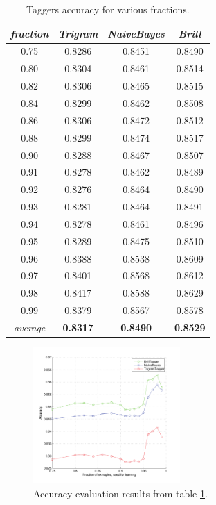 \documentclass[10pt, conference, compsocconf]{IEEEtran}
\begin{document}
\begin{table}[htb]
\begin{center}
\begin{tabular}{c|c|c|c}
\textit{fraction} & \textit{Trigram} & \textit{NaiveBayes} & \textit{Brill} \\\hline\hline
0.75  &  0.8286  &  0.8451  &  0.8490\\
0.80  &  0.8304  &  0.8461  &  0.8514\\
0.82  &  0.8306  &  0.8465  &  0.8515\\
0.84  &  0.8299  &  0.8462  &  0.8508\\
0.86  &  0.8306  &  0.8472  &  0.8512\\
0.88  &  0.8299  &  0.8474  &  0.8517\\
0.90  &  0.8288  &  0.8467  &  0.8507\\
0.91  &  0.8278  &  0.8462  &  0.8489\\
0.92  &  0.8276  &  0.8464  &  0.8490\\
0.93  &  0.8281  &  0.8464  &  0.8491\\
0.94  &  0.8278  &  0.8461  &  0.8496\\
0.95  &  0.8289  &  0.8475  &  0.8510\\
0.96  &  0.8388  &  0.8538  &  0.8609\\
0.97  &  0.8401  &  0.8568  &  0.8612\\
0.98  &  0.8417  &  0.8588  &  0.8629\\
0.99  &  0.8379  &  0.8567  &  0.8578\\\hline\hline
\textit{average} & \textbf{0.8317} & \textbf{0.8490} & \textbf{0.8529}
\end{tabular}
\end{center}
\caption{Taggers accuracy for various fractions.}
\label{tab:evaluation}
\end{table}

\begin{figure}[htb]
\begin{center}
\includegraphics[width=0.5\textwidth]{../evaluation/graph.pdf} 
\end{center}
\caption{Accuracy evaluation results from table \ref{tab:evaluation}.}
\label{fig:evaluation_speed}
\end{figure}
\end{document}
